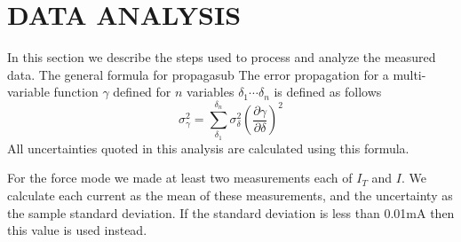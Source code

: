 \documentclass[aps,prstab,reprint,12pt]{revtex4-1}
\begin{document}




\section{DATA ANALYSIS}\label{s:discussion}



In this section we describe the steps used to process and analyze the measured data. The general formula for propagasub
The error propagation for a multi-variable function $\gamma$ defined for $n$ variables $\delta_1\cdots\delta_n$ is defined as follows
\begin{equation}
    \sigma_\gamma^2 = \sum_{\delta_1}^{\delta_n} \sigma_\delta^2 {\left( \frac{\partial \gamma}{\partial \delta} \right)}^2
\end{equation}
All uncertainties quoted in this analysis are calculated using this formula.

For the force mode we made at least two measurements each of $I_T$ and $I$. We calculate each current as the mean of these measurements, and the uncertainty as the sample standard deviation. If the standard deviation is less than 0.01mA then this value is used instead.
\end{document}

